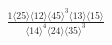 \documentclass[varwidth, border=5pt]{standalone}
\begin{document}
\begin{my}
$\begin{gathered}
\scriptscriptstyle\frac{1⟨25⟩⟨12⟩⟨45⟩^3⟨13⟩⟨15⟩}{⟨14⟩^4⟨24⟩⟨35⟩^3}
\end{gathered}$
\end{my}
\end{document}
